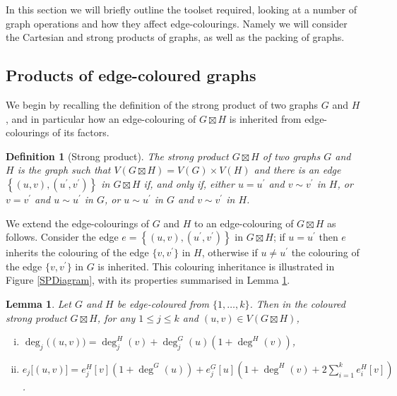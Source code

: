 \documentclass[a4paper,12pt]{article}
\newtheorem{definition}{Definition}[section]
\newtheorem{lemma}[theorem]{Lemma}
\begin{document}
In this section we will briefly outline the toolset required, looking at a number of graph operations and how they affect edge-colourings. Namely we will consider the Cartesian and strong products of graphs, as well as the packing of graphs.

\subsection{Products of edge-coloured graphs}

We begin by recalling the definition of the strong product of two graphs $G$ and $H$, and in particular how an edge-colouring of $G \boxtimes H$ is inherited from edge-colourings of its factors. 

\begin{definition}[Strong product] The strong product $G \boxtimes H$ of two graphs $G$ and $H$ is the graph such that $V\left(G \boxtimes H\right) = V(G) \times V(H)$ and there is an edge $\left\{(u, v), (u^\prime, v^\prime)\right\}$ in $G \boxtimes H$ if, and only if, either $u = u^\prime$ and $v \sim v^\prime$ in $H$, or $v = v^\prime$ and $u \sim u^\prime$ in $G$, or $u \sim u^\prime$ in $G$ and $v \sim v^\prime$ in $H$.
\end{definition}

We extend the edge-colourings of $G$ and $H$ to an edge-colouring of $G \boxtimes H$ as follows. Consider the edge $e = \left\{(u, v), (u^\prime, v^\prime)\right\}$ in $G \boxtimes H$; if $u = u^\prime$ then $e$ inherits the colouring of the edge $\{v, v^\prime\}$ in $H$, otherwise if $u \neq u^\prime$ the colouring of the edge $\{v, v^\prime\}$ in $G$ is inherited. This colouring inheritance is illustrated in Figure \ref{SPDiagram}, with its properties summarised in Lemma \ref{SPColourLemma}.

\begin{lemma}\label{SPColourLemma}
	Let $G$ and $H$ be edge-coloured from $\{1, \dots, k\}$. Then in the coloured strong product $G \boxtimes H$, for any $1 \leq j \leq k$ and $(u, v) \in V(G \boxtimes H)$,
	\begin{enumerate}[i.]
		\item $\deg_j \big((u,v)\big) = \deg_j^H (v) + \deg_j^G (u) \left(1 + \deg^H (v)\right)$,
		\item $e_j \big[(u, v)\big] = e_j^H [v] \left(1 + \deg^G (u)\right) + e_j^G [u] \left(1 + \deg^H (v) + 2\sum\limits_{i = 1}^k e_i^H [v]\right)$.
	\end{enumerate}
\end{lemma}
\end{document}
